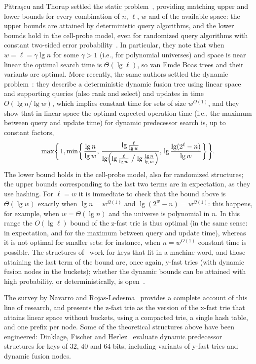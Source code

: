 \documentclass[a4paper]{article}
\newcommand{\?}{\mskip1.5mu}
\begin{document}
P\u{a}tra\c{s}cu and Thorup settled the static problem~\cite{Patrascu2006Timespace,PaTRDNHSP}, providing 
matching upper and lower bounds for every combination of $n$, $\ell$, $w$ and of the available space: the upper bounds are attained by 
deterministic query algorithms, and the lower bounds hold in the cell-probe model, even for randomized query algorithms with constant two-sided error probability~\cite{PaTRDNHSP}. 
In particular, they note that when $w=\ell=\gamma\lg n$ for some $\gamma>1$ (i.e., for polynomial universes) and 
space is near linear the optimal search time is $\Theta(\lg \ell)$, so van Emde Boas trees and their variants are optimal. 
More recently, the same authors settled the dynamic problem~\cite{Patrascu2014Dynamic}: 
they describe a deterministic dynamic fusion tree using linear space and supporting queries (also rank and select) and updates in time 
$O(\lg n/\lg w)$, which implies constant time for sets of size $w^{O(1)}$, and they show that in linear space the optimal expected 
operation time (i.e., the maximum between query and update time) for dynamic predecessor search is, up to constant factors, 
\[
\max\biggl\{\?1,\min\biggl\{\?\frac{\lg n}{\lg w},
\,\frac{\lg\frac{\ell}{\lg w}}{\lg\Bigl(\lg\frac{\ell}{\lg w}\bigm/\lg\frac{\lg n}{\lg w}\Bigr)},
\,\lg\frac{\lg(2^\ell-n)}{\lg w}\?\biggr\}\?\biggr\}.
\]
The lower bound holds in the cell-probe model, also for randomized structures; the upper bounds corresponding 
to the last two terms are in expectation, as they use hashing. 
For $\ell=w$ it is immediate to check that the bound above is $\Theta(\lg w)$ exactly when $\lg n=w^{\Omega(1)}$ and
$\lg(2^w-n)=w^{\Omega(1)}$: this happens, for example, when $w=\Theta(\lg n)$ and the universe is polynomial in $n$.
In this range the $O(\lg \ell)$ bound of the z-fast trie is thus optimal (in the same sense: in expectation, and for 
the maximum between query and update time), whereas it is not optimal for smaller sets: 
for instance, when $n=w^{O(1)}$ constant time is possible. 
The structures of~\cite{Patrascu2014Dynamic} work for keys that fit in a machine word, and those 
attaining the last term of the bound are, once again, y-fast tries (with dynamic fusion nodes in the buckets); 
whether the dynamic bounds can be attained with high probability, or deterministically, is open~\cite{Navarro2020Predecessor}.

The survey by Navarro and Rojas-Ledesma~\cite{Navarro2020Predecessor} provides a complete account of this line of 
research, and presents the z-fast trie as the version of the x-fast trie that attains linear space without buckets, 
using a compacted trie, a single hash table, and one prefix per node. Some of the theoretical structures above have been
engineered: Dinklage, Fischer and Herlez~\cite{Dinklage2021Engineering} evaluate dynamic predecessor structures for keys of $32$, 
$40$ and $64$ bits, including variants of y-fast tries and dynamic fusion nodes.
\end{document}
